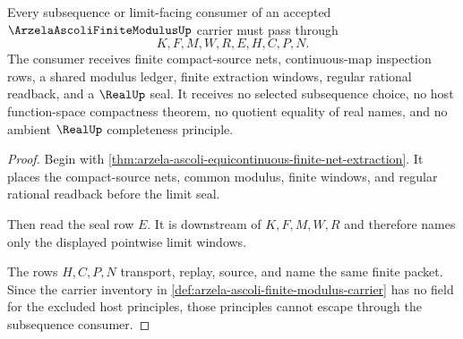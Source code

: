 \begin{theorem}
\label{thm:arzela-ascoli-subsequence-nonescape}
Every subsequence or limit-facing consumer of an accepted $\ArzelaAscoliFiniteModulusUp$ carrier must pass through
$$
K,F,M,W,R,E,H,C,P,N .
$$
The consumer receives finite compact-source nets, continuous-map inspection rows, a shared modulus ledger, finite extraction windows, regular rational readback, and a $\RealUp$ seal. It receives no selected subsequence choice, no host function-space compactness theorem, no quotient equality of real names, and no ambient $\RealUp$ completeness principle.
\end{theorem}
\begin{proof}
Begin with \autoref{thm:arzela-ascoli-equicontinuous-finite-net-extraction}. It places the compact-source nets, common modulus, finite windows, and regular rational readback before the limit seal.

Then read the seal row $E$. It is downstream of $K,F,M,W,R$ and therefore names only the displayed pointwise limit windows.

The rows $H,C,P,N$ transport, replay, source, and name the same finite packet. Since the carrier inventory in \autoref{def:arzela-ascoli-finite-modulus-carrier} has no field for the excluded host principles, those principles cannot escape through the subsequence consumer.
\end{proof}

